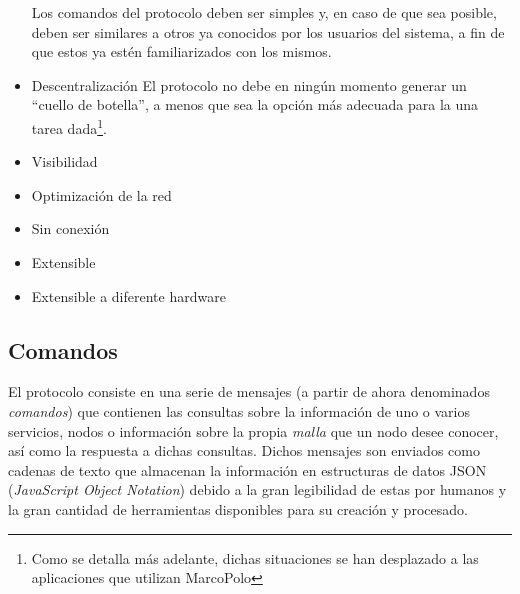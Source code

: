 \begin{itemize}
	Los comandos del protocolo deben ser simples y, en caso de que sea posible, deben ser similares a otros ya conocidos por los usuarios del sistema, a fin de que estos ya estén familiarizados con los mismos.
	\item Descentralización
	El protocolo no debe en ningún momento generar un ``cuello de botella'', a menos que sea la opción más adecuada para la una tarea dada\footnote{Como se detalla más adelante, dichas situaciones se han desplazado a las aplicaciones que utilizan MarcoPolo}.
	\item Visibilidad
	\item Optimización de la red
	\item Sin conexión
	\item Extensible
	\item Extensible a diferente hardware
\end{itemize}

\subsection{Comandos}

El protocolo consiste en una serie de mensajes (a partir de ahora denominados \textit{comandos}) que contienen las consultas sobre la información de uno o varios servicios, nodos o información sobre la propia \textit{malla} que un nodo desee conocer, así como la respuesta a dichas consultas. Dichos mensajes son enviados como cadenas de texto que almacenan la información en estructuras de datos JSON (\textit{JavaScript Object Notation}) debido a la gran legibilidad de estas por humanos y la gran cantidad de herramientas disponibles para su creación y procesado.

